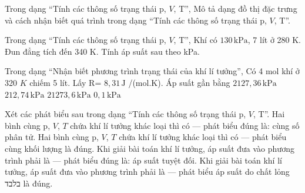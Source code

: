 \begin{ex}
Trong dạng “Tính các thông số trạng thái p, $V$, T”, Mô tả dạng đồ thị đặc trưng và cách nhận biết quá trình trong dạng “Tính các thông số trạng thái p, $V$, T”.
\choiceTF

\end{ex}

\begin{ex}
Trong dạng “Tính các thông số trạng thái p, $V$, T”, Khí có $130\,\text{kPa}$, 7 lít ở 280 K. Đun đẳng tích đến 340 K. Tính áp suất sau theo kPa.
\end{ex}

\begin{ex}
Trong dạng “Nhận biết phương trình trạng thái của khí lí tưởng”, Có 4 mol khí ở 320 $K$ chiếm 5 lít. Lấy R= $8,31\,\text{J}$ /(mol.K). Áp suất gần bằng
\choice
{\True $2127,36\,\text{kPa}$}
{$212,74\,\text{kPa}$}
{$21273,6\,\text{kPa}$}
{$0,1\,\text{kPa}$}
\end{ex}

\begin{ex}
Xét các phát biểu sau trong dạng “Tính các thông số trạng thái p, $V$, T”.
\choiceTF
{\True Hai bình cùng p, $V$, $T$ chứa khí lí tưởng khác loại thì có — phát biểu đúng là: cùng số phân tử.}
{Hai bình cùng p, $V$, $T$ chứa khí lí tưởng khác loại thì có — phát biểu cùng khối lượng là đúng.}
{\True Khi giải bài toán khí lí tưởng, áp suất đưa vào phương trình phải là — phát biểu đúng là: áp suất tuyệt đối.}
{Khi giải bài toán khí lí tưởng, áp suất đưa vào phương trình phải là — phát biểu áp suất do chất lỏng בלבד là đúng.}
\end{ex}

